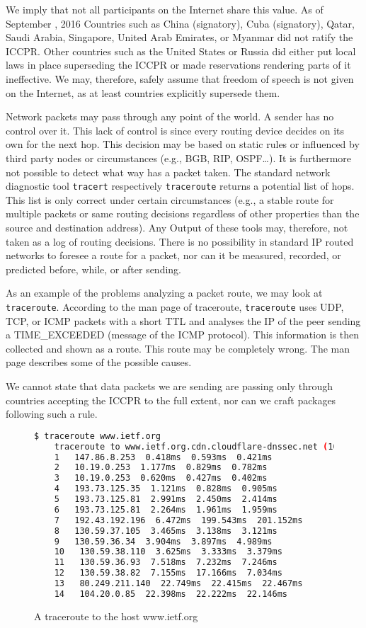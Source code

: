 We imply that not all participants on the Internet share this value. As of September , 2016 Countries such as China (signatory), Cuba (signatory), Qatar, Saudi Arabia, Singapore, United Arab Emirates, or Myanmar did not ratify the ICCPR. Other countries such as the United States or Russia did either put local laws in place superseding the ICCPR or made reservations rendering parts of it ineffective. We may, therefore, safely assume that freedom of speech is not given on the Internet, as at least countries explicitly supersede them.

Network packets may pass through any point of the world. A sender has no control over it. This lack of control is since every routing device decides on its own for the next hop. This decision may be based on static rules or influenced by third party nodes or circumstances (e.g., BGB, RIP, OSPF\ldots). It is furthermore not possible to detect what way has a packet taken. The standard network diagnostic tool \verb|tracert| respectively \verb|traceroute| returns a potential list of hops. This list is only correct under certain circumstances (e.g., a stable route for multiple packets or same routing decisions regardless of other properties than the source and destination address). Any Output of these tools may, therefore, not taken as a log of routing decisions. There is no possibility in standard IP routed networks to foresee a route for a packet, nor can it be measured, recorded, or predicted before, while, or after sending. 

As an example of the problems analyzing a packet route, we may look at \verb|traceroute|. According to the man page of traceroute, \verb|traceroute| uses UDP, TCP, or ICMP packets with a short TTL and analyses the IP of the peer sending a TIME\_EXCEEDED (message of the ICMP protocol). This information is then collected and shown as a route. This route may be completely wrong. The man page describes some of the possible causes.

We cannot state that data packets we are sending are passing only through countries accepting the ICCPR to the full extent, nor can we craft packages following such a rule.

\begin{figure}[H]
	\begin{lstlisting}[language=bash,breaklines=true,basicstyle=\tiny]
	$ traceroute www.ietf.org
	traceroute to www.ietf.org.cdn.cloudflare-dnssec.net (104.20.0.85), 64 hops max
	1   147.86.8.253  0.418ms  0.593ms  0.421ms
	2   10.19.0.253  1.177ms  0.829ms  0.782ms
	3   10.19.0.253  0.620ms  0.427ms  0.402ms
	4   193.73.125.35  1.121ms  0.828ms  0.905ms
	5   193.73.125.81  2.991ms  2.450ms  2.414ms
	6   193.73.125.81  2.264ms  1.961ms  1.959ms
	7   192.43.192.196  6.472ms  199.543ms  201.152ms
	8   130.59.37.105  3.465ms  3.138ms  3.121ms
	9   130.59.36.34  3.904ms  3.897ms  4.989ms
	10   130.59.38.110  3.625ms  3.333ms  3.379ms
	11   130.59.36.93  7.518ms  7.232ms  7.246ms
	12   130.59.38.82  7.155ms  17.166ms  7.034ms
	13   80.249.211.140  22.749ms  22.415ms  22.467ms
	14   104.20.0.85  22.398ms  22.222ms  22.146ms
	\end{lstlisting}
	\caption{A traceroute to the host www.ietf.org}
\end{figure}

